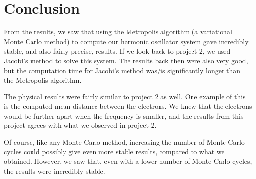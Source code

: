 \documentclass[12pt]{article}
\begin{document}
\section{Conclusion}\label{section:conclusion}
From the results, we saw that using the Metropolis algorithm (a variational Monte Carlo method) to compute our harmonic oscillator system gave incredibly stable, and also fairly precise, results. If we look back to project 2, we used Jacobi's method to solve this system. The results back then were also very good, but the computation time for Jacobi's method was/is significantly longer than the Metropolis algorithm.

The physical results were fairly similar to project 2 as well. One example of this is the computed mean distance between the electrons. We knew that the electrons would be further apart when the frequency is smaller, and the results from this project agrees with what we observed in project 2. 

Of course, like any Monte Carlo method, increasing the number of Monte Carlo cycles could possibly give even more stable results, compared to what we obtained. However, we saw that, even with a lower number of Monte Carlo cycles, the results were incredibly stable.  
\FloatBarrier
\end{document}
